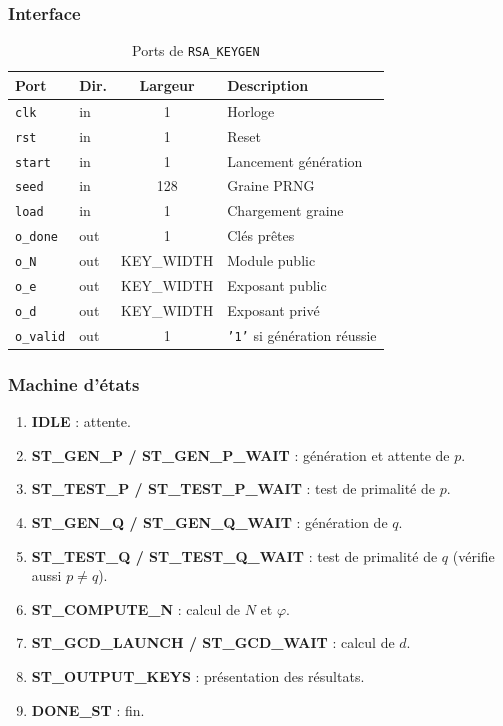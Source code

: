 \subsubsection{Interface}
\begin{table}[H]
\centering
\caption{Ports de \texttt{RSA\_KEYGEN}}
\begin{tabular}{llcp{5cm}}
\toprule
\textbf{Port} & \textbf{Dir.} & \textbf{Largeur} & \textbf{Description} \\
\midrule
\texttt{clk}     & in  & 1   & Horloge \\
\texttt{rst}     & in  & 1   & Reset \\
\texttt{start}   & in  & 1   & Lancement génération \\
\texttt{seed}    & in  & 128 & Graine PRNG \\
\texttt{load}    & in  & 1   & Chargement graine \\
\texttt{o\_done}  & out & 1   & Clés prêtes \\
\texttt{o\_N}     & out & KEY\_WIDTH & Module public \\
\texttt{o\_e}     & out & KEY\_WIDTH & Exposant public \\
\texttt{o\_d}     & out & KEY\_WIDTH & Exposant privé \\
\texttt{o\_valid} & out & 1   & \texttt{'1'} si génération réussie \\
\bottomrule
\end{tabular}
\end{table}

\subsubsection{Machine d'états}
\begin{enumerate}
  \item \textbf{IDLE} : attente.
  \item \textbf{ST\_GEN\_P / ST\_GEN\_P\_WAIT} : génération et attente de $p$.
  \item \textbf{ST\_TEST\_P / ST\_TEST\_P\_WAIT} : test de primalité de $p$.
  \item \textbf{ST\_GEN\_Q / ST\_GEN\_Q\_WAIT} : génération de $q$.
  \item \textbf{ST\_TEST\_Q / ST\_TEST\_Q\_WAIT} : test de primalité de $q$
        (vérifie aussi $p \neq q$).
  \item \textbf{ST\_COMPUTE\_N} : calcul de $N$ et $\varphi$.
  \item \textbf{ST\_GCD\_LAUNCH / ST\_GCD\_WAIT} : calcul de $d$.
  \item \textbf{ST\_OUTPUT\_KEYS} : présentation des résultats.
  \item \textbf{DONE\_ST} : fin.
\end{enumerate}

